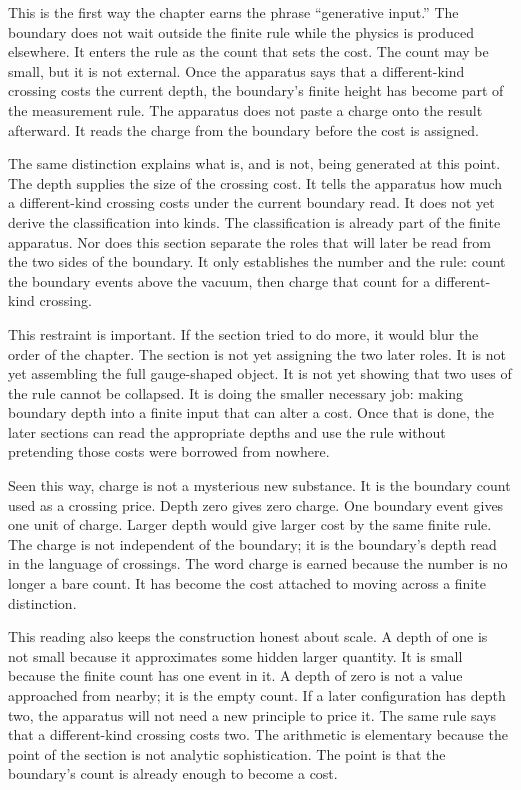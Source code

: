 This is the first way the chapter earns the phrase ``generative input.'' The boundary
does not wait outside the finite rule while the physics is produced elsewhere. It
enters the rule as the count that sets the cost. The count may be small, but it is not
external. Once the apparatus says that a different-kind crossing costs the current
depth, the boundary's finite height has become part of the measurement rule. The
apparatus does not paste a charge onto the result afterward. It reads the charge from
the boundary before the cost is assigned.

The same distinction explains what is, and is not, being generated at this point. The
depth supplies the size of the crossing cost. It tells the apparatus how much a
different-kind crossing costs under the current boundary read. It does not yet derive
the classification into kinds. The classification is already part of the finite
apparatus. Nor does this section separate the roles that will later be read from the
two sides of the boundary. It only establishes the number and the rule: count the
boundary events above the vacuum, then charge that count for a different-kind crossing.

This restraint is important. If the section tried to do more, it would blur the order
of the chapter. The section is not yet assigning the two later roles. It is not yet
assembling the full gauge-shaped object. It is not yet showing that two uses of the
rule cannot be collapsed. It is doing the smaller necessary job: making boundary
depth into a finite input that can alter a cost. Once that is done, the later sections
can read the appropriate depths and use the rule without pretending those costs were
borrowed from nowhere.

Seen this way, charge is not a mysterious new substance. It is the boundary count
used as a crossing price. Depth zero gives zero charge. One boundary event gives one
unit of charge. Larger depth would give larger cost by the same finite rule. The
charge is not independent of the boundary; it is the boundary's depth read in the
language of crossings. The word charge is earned because the number is no longer a
bare count. It has become the cost attached to moving across a finite distinction.

This reading also keeps the construction honest about scale. A depth of one is not
small because it approximates some hidden larger quantity. It is small because the
finite count has one event in it. A depth of zero is not a value approached from
nearby; it is the empty count. If a later configuration has depth two, the apparatus
will not need a new principle to price it. The same rule says that a different-kind
crossing costs two. The arithmetic is elementary because the point of the section is
not analytic sophistication. The point is that the boundary's count is already enough
to become a cost.

